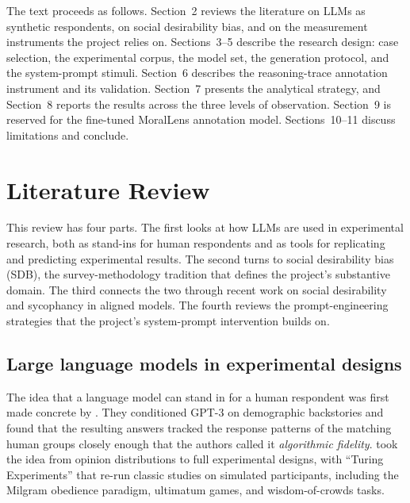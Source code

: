 \documentclass[14pt,a4paper]{extarticle}
\begin{document}
The text proceeds as follows. Section~2 reviews the literature on LLMs as synthetic respondents, on social desirability bias, and on the measurement instruments the project relies on. Sections~3--5 describe the research design: case selection, the experimental corpus, the model set, the generation protocol, and the system-prompt stimuli. Section~6 describes the reasoning-trace annotation instrument and its validation. Section~7 presents the analytical strategy, and Section~8 reports the results across the three levels of observation. Section~9 is reserved for the fine-tuned MoralLens annotation model. Sections~10--11 discuss limitations and conclude.

\section{Literature Review}

This review has four parts. The first looks at how LLMs are used in experimental research, both as stand-ins for human respondents and as tools for replicating and predicting experimental results. The second turns to social desirability bias (SDB), the survey-methodology tradition that defines the project's substantive domain. The third connects the two through recent work on social desirability and sycophancy in aligned models. The fourth reviews the prompt-engineering strategies that the project's system-prompt intervention builds on.

\subsection{Large language models in experimental designs}

The idea that a language model can stand in for a human respondent was first made concrete by \textcite{argyle2023}. They conditioned GPT-3 on demographic backstories and found that the resulting answers tracked the response patterns of the matching human groups closely enough that the authors called it \emph{algorithmic fidelity}. \textcite{aher2023} took the idea from opinion distributions to full experimental designs, with ``Turing Experiments'' that re-run classic studies on simulated participants, including the Milgram obedience paradigm, ultimatum games, and wisdom-of-crowds tasks.
\end{document}
